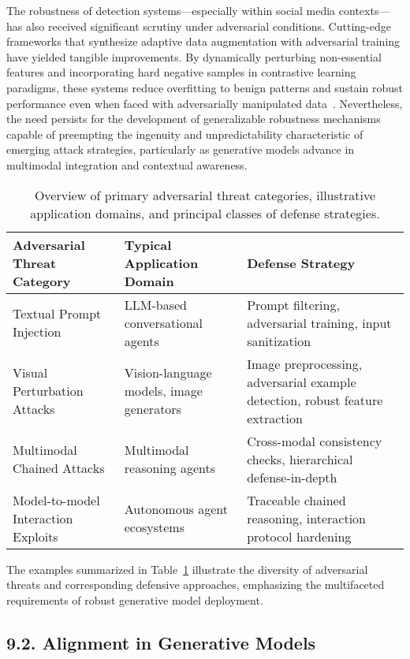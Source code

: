 \documentclass[11pt]{article}
\begin{document}
The robustness of detection systems—especially within social media contexts—has also received significant scrutiny under adversarial conditions. Cutting-edge frameworks that synthesize adaptive data augmentation with adversarial training have yielded tangible improvements. By dynamically perturbing non-essential features and incorporating hard negative samples in contrastive learning paradigms, these systems reduce overfitting to benign patterns and sustain robust performance even when faced with adversarially manipulated data~\cite{ref67}. Nevertheless, the need persists for the development of generalizable robustness mechanisms capable of preempting the ingenuity and unpredictability characteristic of emerging attack strategies, particularly as generative models advance in multimodal integration and contextual awareness.

\begin{table}[ht]
\centering
\begin{tabular}{|p{3.8cm}|p{4.3cm}|p{4.5cm}|}
\hline
\textbf{Adversarial Threat Category} & \textbf{Typical Application Domain} & \textbf{Defense Strategy} \\
\hline
Textual Prompt Injection & LLM-based conversational agents & Prompt filtering, adversarial training, input sanitization \\
\hline
Visual Perturbation Attacks & Vision-language models, image generators & Image preprocessing, adversarial example detection, robust feature extraction \\
\hline
Multimodal Chained Attacks & Multimodal reasoning agents & Cross-modal consistency checks, hierarchical defense-in-depth \\
\hline
Model-to-model Interaction Exploits & Autonomous agent ecosystems & Traceable chained reasoning, interaction protocol hardening \\
\hline
\end{tabular}
\caption{Overview of primary adversarial threat categories, illustrative application domains, and principal classes of defense strategies.}
\label{tab:threat_types}
\end{table}

The examples summarized in Table~\ref{tab:threat_types} illustrate the diversity of adversarial threats and corresponding defensive approaches, emphasizing the multifaceted requirements of robust generative model deployment.

\subsection{9.2. Alignment in Generative Models}
\end{document}
